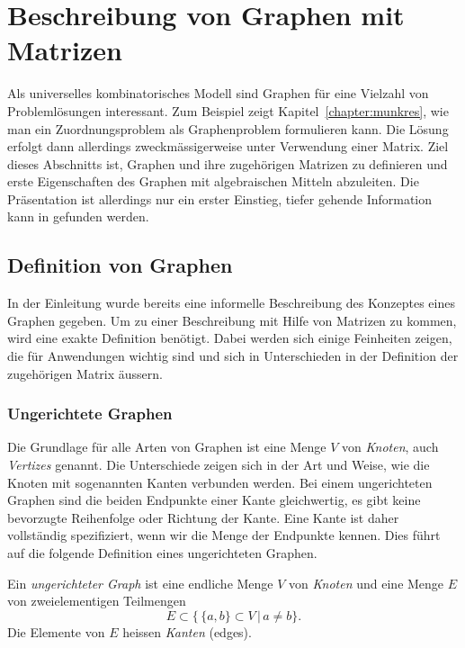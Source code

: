 %
%
%
\section{Beschreibung von Graphen mit Matrizen
\label{buch:section:beschreibung-von-graphen-mit-matrizen}}
Als universelles kombinatorisches Modell sind Graphen für eine
Vielzahl von Problemlösungen interessant.
Zum Beispiel zeigt Kapitel~\ref{chapter:munkres}, wie man
ein Zuordnungsproblem als Graphenproblem formulieren kann.
Die Lösung erfolgt dann allerdings zweckmässigerweise unter
Verwendung einer Matrix.
Ziel dieses Abschnitts ist, Graphen und ihre zugehörigen Matrizen
zu definieren und erste Eigenschaften des Graphen mit algebraischen
Mitteln abzuleiten.
Die Präsentation ist allerdings nur ein erster Einstieg, tiefer
gehende Information kann in \cite{skript:brualdi} gefunden werden.

\subsection{Definition von Graphen
\label{subsection:definition-von-graphen}}
In der Einleitung wurde bereits eine informelle
Beschreibung des Konzeptes eines Graphen gegeben.
Um zu einer Beschreibung mit Hilfe von Matrizen zu kommen,
wird eine exakte Definition benötigt.
Dabei werden sich einige Feinheiten zeigen, die für Anwendungen wichtig
sind und sich in Unterschieden in der Definition der zugehörigen Matrix 
äussern.

\subsubsection{Ungerichtete Graphen}
Die Grundlage für alle Arten von Graphen ist eine Menge $V$ von {\em Knoten},
auch {\em Vertizes} genannt.
%
%
Die Unterschiede zeigen sich in der Art und Weise, wie die Knoten
mit sogenannten Kanten
%
verbunden werden.
Bei einem ungerichteten Graphen sind die beiden Endpunkte einer Kante
gleichwertig, es gibt keine bevorzugte Reihenfolge oder Richtung der
Kante.
Eine Kante ist daher vollständig spezifiziert, wenn wir die
Menge der Endpunkte kennen.
Dies führt auf die folgende Definition eines ungerichteten Graphen.

\begin{definition}
\label{buch:def:ungerichteter-graph}
%
%
Ein {\em ungerichteter Graph} ist eine endliche Menge $V$ von {\em Knoten}
und eine Menge $E$ von zweielementigen Teilmengen 
\[
E \subset \{\, \{a,b\}\subset V\,|\, a\ne b\}.
\]
Die Elemente von $E$ heissen {\em Kanten} (edges).
\end{definition}


